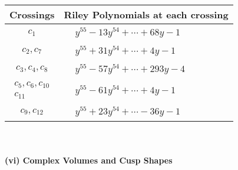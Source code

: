 \documentclass[1p]{elsarticle_modified}
\theoremstyle{definition}
\begin{document}
\begin{tabular}{m{50pt}|m{274pt}}
Crossings & \hspace{64pt}Riley Polynomials at each crossing \\
\hline $$\begin{aligned}c_{1}\end{aligned}$$&$\begin{aligned}
&y^{55}-13 y^{54}+\cdots+68 y-1
\end{aligned}$\\
\hline $$\begin{aligned}c_{2},c_{7}\end{aligned}$$&$\begin{aligned}
&y^{55}+31 y^{54}+\cdots+4 y-1
\end{aligned}$\\
\hline $$\begin{aligned}c_{3},c_{4},c_{8}\end{aligned}$$&$\begin{aligned}
&y^{55}-57 y^{54}+\cdots+293 y-4
\end{aligned}$\\
\hline $$\begin{aligned}c_{5},c_{6},c_{10}\\c_{11}\end{aligned}$$&$\begin{aligned}
&y^{55}-61 y^{54}+\cdots+4 y-1
\end{aligned}$\\
\hline $$\begin{aligned}c_{9},c_{12}\end{aligned}$$&$\begin{aligned}
&y^{55}+23 y^{54}+\cdots-36 y-1
\end{aligned}$\\
\hline
\end{tabular}\\~\\
\newpage\flushleft \textbf{(vi) Complex Volumes and Cusp Shapes}
\end{document}
